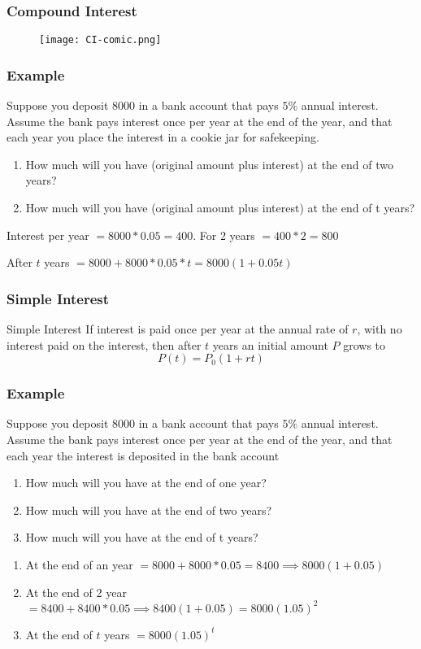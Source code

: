     \begin{frame}
      \frametitle{Compound Interest}
      \begin{figure}
        \texttt{[image: CI-comic.png]}
      \end{figure}
    \end{frame}

    \begin{frame}
      \frametitle{Example}
      Suppose you deposit \(8000\) in a bank account that pays \(5\%\) annual interest. Assume the bank pays interest once per year at the end of the year, and that each year you place the interest in a cookie jar for safekeeping.
      \begin{enumerate}
        \item  How much will you have (original amount plus interest) at the end of two
        years?
        \item How much will you have (original amount plus interest) at the end of t years?
      \end{enumerate}
      \pause 
      Interest per year \( = 8000*0.05 = 400 \). For 2 years \( = 400*2 = 800\)

      After \(t\) years \(= 8000 + 8000*0.05*t = 8000(1+0.05t)\)
    \end{frame}

    \begin{frame}
      \frametitle{Simple Interest}
      \begin{block}{Simple Interest}
        If interest is paid once per year at the annual rate of \(r\), with no interest paid on the interest, then after \(t\) years 
        an initial amount \(P\) grows to 
        \[
           P(t) = P_{0}(1 + rt) 
        \]
        
      \end{block}
    \end{frame}

    \begin{frame}
      \frametitle{Example}
      Suppose you deposit \(8000\) in a bank account that pays \(5\%\) annual interest. Assume the bank pays interest once per year at the end of the year, and that each year the interest is deposited in the bank account
      \begin{enumerate}
        \item How much will you have at the end of one year?
        \item How much will you have at the end of two years?
        \item How much will you have at the end of t years?
      \end{enumerate}
      \pause 
      \begin{enumerate}
        \item  At the end of an year \( =  8000 + 8000*0.05  = 8400 \implies 8000(1+0.05)\)
        \item  At the end of 2 year \( = 8400 + 8400*0.05 \implies 8400( 1 + 0.05) = 8000(1.05)^{2} \) 
        \item  At the end of \(t\) years \(= 8000(1.05)^{t}\)
      \end{enumerate}
     
    \end{frame}


